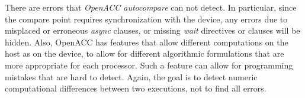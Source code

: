 There are errors that \emph{OpenACC autocompare} can not detect.
In particular, since the compare point requires synchronization with the device, any errors due to misplaced or erroneous \emph{async} clauses, or missing \emph{wait} directives or clauses will be hidden.
Also, OpenACC has features that allow different computations on the host as on the device, to allow for different algorithmic formulations that are more appropriate for each processor.
Such a feature can allow for programming mistakes that are hard to detect.
Again, the goal is to detect numeric computational differences between two executions, not to find all errors.
